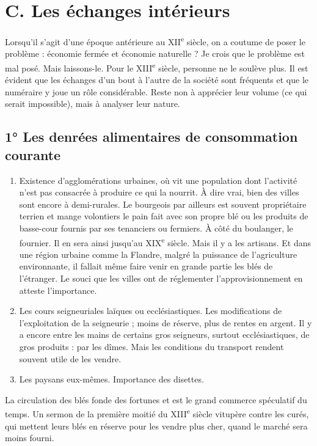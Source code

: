 \documentclass[french,twoside]{book} %
\def\bignobreak{\ifdim\lastskip<\bigskipamount
  \removelastskip\nopagebreak\bigskip\fi}
\newcommand{\labelblock}[1]{\bigskip{\color{rubric}\bfseries\centering #1\par}\bignobreak}
\begin{document}
\section[C. Les échanges intérieurs]{C. Les échanges intérieurs}
\label{c09c}
\noindent Lorsqu’il s’agit d’une époque antérieure au XII\textsuperscript{e} siècle, on a coutume de poser le problème : économie fermée et économie naturelle ? Je crois que le problème est mal posé. Mais laissons-le. Pour le XIII\textsuperscript{e} siècle, personne ne le soulève plus. Il est évident que les échanges d’un bout à l’autre de la société sont fréquents et que le numéraire y joue un rôle considérable. Reste non à apprécier leur volume (ce qui serait impossible), mais à analyser leur nature.\par

\labelblock{Quels sont les principaux objets des échanges ?}

\subsection[1° Les denrées alimentaires de consommation courante]{1° Les denrées alimentaires de consommation courante}

\begin{enumerate}[itemsep=0pt,]
\item Existence d’agglomérations urbaines, où vit une population dont l’activité n’est pas consacrée à produire ce qui la nourrit. À dire vrai, bien des villes sont encore à demi-rurales. Le bourgeois par ailleurs est souvent propriétaire terrien et mange volontiers le pain fait avec son propre blé ou les produits de basse-cour fournis par ses tenanciers ou fermiers. À côté du boulanger, le fournier. Il en sera ainsi jusqu’au XIX\textsuperscript{e} siècle. Mais il y a les artisans. Et dans une région urbaine comme la Flandre, malgré la puissance de l’agriculture environnante, il fallait même faire venir en grande partie les blés de l’étranger. Le souci que les villes ont de réglementer l’approvisionnement en atteste l’importance.
\item Les cours seigneuriales laïques ou ecclésiastiques. Les modifications de l’exploitation de la seigneurie ; moins de réserve, plus de rentes en argent. Il y a encore entre les mains de certains gros seigneurs, surtout ecclésiastiques, de gros produits : par les dîmes. Mais les conditions du transport rendent souvent utile de les vendre.
\item  {}
\label{p90} Les paysans eux-mêmes. Importance des disettes.

\end{enumerate}\noindent La circulation des blés fonde des fortunes et est le grand commerce spéculatif du temps. Un sermon de la première moitié du XIII\textsuperscript{e} siècle vitupère contre les curés, qui mettent leurs blés en réserve pour les vendre plus cher, quand le marché sera moins fourni.
\end{document}
